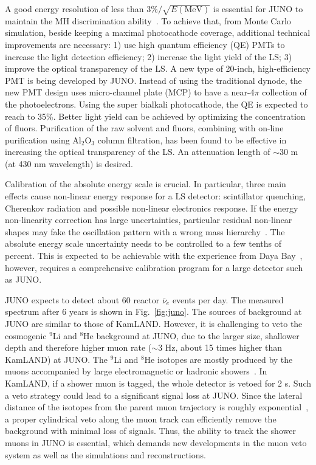 A good energy resolution of less than $3\%/\sqrt{E(\textrm{MeV})}$ is essential for JUNO to maintain the MH discrimination ability~\cite{Li-PRD13}. 
To achieve that, from Monte Carlo simulation, beside keeping a maximal photocathode coverage, additional technical improvements are necessary: 
1) use high quantum efficiency (QE) PMTs to increase the light detection efficiency;
2) increase the light yield of the LS;
3) improve the optical transparency of the LS.
A new type of 20-inch, high-efficiency PMT is being developed by JUNO. Instead of using the traditional dynode, the new PMT design uses micro-channel plate (MCP) to have a near-4$\pi$ collection of the photoelectrons. 
Using the super bialkali photocathode, the QE is expected to reach to 35\%. 
Better light yield can be achieved by optimizing the concentration of fluors. 
Purification of the raw solvent and fluors, combining with on-line purification using Al$_2$O$_3$ column filtration, has been found to be effective in increasing the optical transparency of the LS. An attenuation length of $\sim$30 m (at 430 nm wavelength) is desired.

Calibration of the absolute energy scale is crucial. 
In particular, three main effects cause non-linear energy response for a LS detector: scintillator quenching, Cherenkov radiation and possible non-linear electronics response. 
If the energy non-linearity correction has large uncertainties, particular residual non-linear shapes may fake the oscillation pattern with a wrong mass hierarchy~\cite{Qian-PRD13}. 
The absolute energy scale uncertainty needs to be controlled to a few tenths of percent. 
This is expected to be achievable with the experience from Daya Bay~\cite{Zhang-Neutrino14}, however, requires a comprehensive calibration program for a large detector such as JUNO.

JUNO expects to detect about 60 reactor $\bar\nu_e$ events per day. The measured spectrum after 6 years is shown in Fig.~\ref{fig:juno}.
The sources of background at JUNO are similar to those of KamLAND. 
However, it is challenging to veto the cosmogenic $^9$Li and $^8$He background at JUNO, due to the larger size, shallower depth and therefore higher muon rate ($\sim$3 Hz, about 15 times higher than KamLAND) at JUNO. 
The $^9$Li and $^8$He isotopes are mostly produced by the muons accompanied by large electromagnetic or hadronic showers~\cite{KamLAND-spall}. In KamLAND, if a shower muon is tagged, the whole detector is vetoed for 2 s. Such a veto strategy could lead to a significant signal loss at JUNO. 
Since the lateral distance of the isotopes from the parent muon trajectory is roughly exponential~\cite{KamLAND-spall}, a proper cylindrical veto along the muon track can efficiently remove the background with minimal loss of signals. Thus, the ability to track the shower muons in JUNO is essential, which demands new developments in the muon veto system as well as the simulations and reconstructions.

